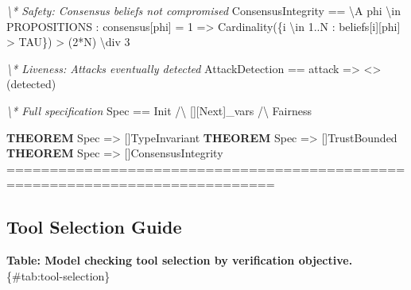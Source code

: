 \documentclass[
]{article}
\newenvironment{Shaded}{}{}
\newcommand{\CommentTok}[1]{\textcolor[rgb]{0.38,0.63,0.69}{\textit{#1}}}
\newcommand{\DecValTok}[1]{\textcolor[rgb]{0.25,0.63,0.44}{#1}}
\newcommand{\KeywordTok}[1]{\textcolor[rgb]{0.00,0.44,0.13}{\textbf{#1}}}
\newcommand{\NormalTok}[1]{#1}
\begin{document}
\begin{Shaded}
\begin{Highlighting}[]
\CommentTok{\textbackslash{}* Safety: Consensus beliefs not compromised}
\NormalTok{ConsensusIntegrity ==}
\NormalTok{  \textbackslash{}A phi \textbackslash{}in PROPOSITIONS :}
\NormalTok{    consensus[phi] = }\DecValTok{1}\NormalTok{ =\textgreater{}}
\NormalTok{      Cardinality(\{i \textbackslash{}in }\DecValTok{1}\NormalTok{..N : beliefs[i][phi] \textgreater{} TAU\}) \textgreater{} (}\DecValTok{2}\NormalTok{*N) \textbackslash{}div }\DecValTok{3}

\CommentTok{\textbackslash{}* Liveness: Attacks eventually detected}
\NormalTok{AttackDetection ==}
\NormalTok{  attack =\textgreater{} \textless{}\textgreater{}(detected)}

\CommentTok{\textbackslash{}* Full specification}
\NormalTok{Spec == Init /\textbackslash{} [][Next]\_vars /\textbackslash{} Fairness}

\KeywordTok{THEOREM}\NormalTok{ Spec =\textgreater{} []TypeInvariant}
\KeywordTok{THEOREM}\NormalTok{ Spec =\textgreater{} []TrustBounded}
\KeywordTok{THEOREM}\NormalTok{ Spec =\textgreater{} []ConsensusIntegrity}
\NormalTok{=============================================================================}
\end{Highlighting}
\end{Shaded}

\subsection{Tool Selection Guide}\label{sec:tool-selection}

\textbf{Table: Model checking tool selection by verification objective.}
\{\#tab:tool-selection\}
\end{document}

